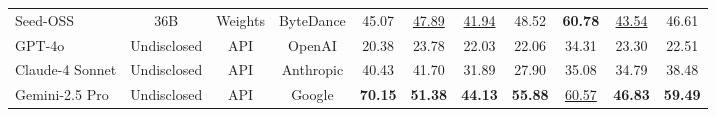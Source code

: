 \begin{table}[tbp]
{\begin{tabular}{lccc|cccccc|c}
Seed-OSS     & 36B &Weights & ByteDance & 45.07 & \underline{47.89} & \underline{41.94} & 48.52 & \textbf{60.78} & \underline{43.54} & 46.61 \\
GPT-4o  & Undisclosed & API & OpenAI & 20.38 & 23.78 & 22.03 & 22.06 & 34.31 & 23.30 & 22.51 \\
Claude-4 Sonnet  & Undisclosed & API & Anthropic & 40.43 & 41.70 & 31.89 & 27.90 & 35.08 & 34.79 & 38.48 \\
Gemini-2.5 Pro  & Undisclosed & API & Google & \textbf{70.15} & \textbf{51.38} & \textbf{44.13} & \textbf{55.88} & \underline{60.57} & \textbf{46.83} & \textbf{59.49} \\
            \bottomrule
        \end{tabular}}
    \label{tab:main_results_kd_llms}
    \vspace{-3mm}
\end{table}











